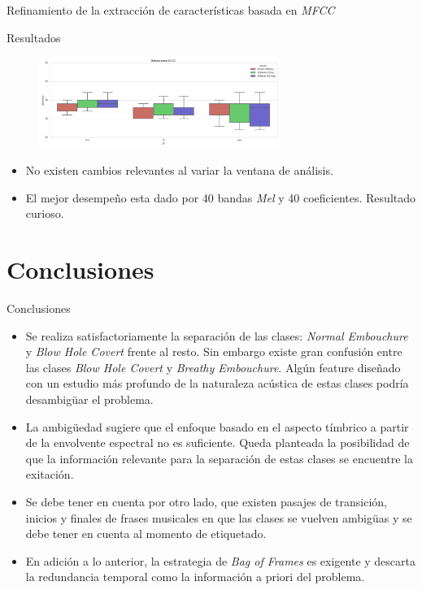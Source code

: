 \documentclass[aspectratio=169]{beamer}
\begin{document}
\begin{frame}{Refinamiento de la extracción de características basada en \textit{MFCC}}
\begin{block}{Resultados}
\begin{figure}[H]
\begin{center}
\includegraphics[width=0.7\textwidth]{exp3_refinamiento} 
\end{center}
\end{figure}
\end{block}
\begin{itemize}
\item No existen cambios relevantes al variar la ventana de análisis.
\item \alert{El mejor desempeño esta dado por 40 bandas \textit{Mel} y 40 coeficientes.} Resultado curioso.
\end{itemize}
\end{frame}


\section{Conclusiones}

\begin{frame}{Conclusiones}
\begin{itemize}
\item Se realiza satisfactoriamente la separación de las clases: \textit{Normal Embouchure} y \textit{Blow Hole Covert} frente al resto. Sin embargo existe gran confusión entre las clases \textit{Blow Hole Covert} y \textit{Breathy Embouchure}. Algún feature diseñado con un estudio más profundo de la naturaleza acústica de estas clases podría desambigüar el problema.
\item La ambigüedad sugiere que el enfoque basado en el aspecto tímbrico a partir de la envolvente espectral no es suficiente. Queda planteada la posibilidad de que la información relevante para la separación de estas clases se encuentre la exitación.
\item Se debe tener en cuenta por otro lado, que existen pasajes de transición, inicios y finales de frases musicales en que las clases se vuelven ambigüas y se debe tener en cuenta al momento de etiquetado.
\item En adición a lo anterior, la estrategia de \textit{Bag of Frames} es exigente y descarta la redundancia temporal como la información a priori del problema.
\end{itemize}
\end{frame}
\end{document}
